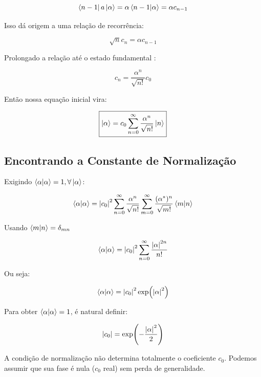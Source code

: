 \documentclass[12pt,a4paper]{report}
\begin{document}
\begin{equation*}
    \bra{n-1}a\ket{\alpha}=\alpha\braket{n-1}{\alpha}=\alpha c_{n-1}
\end{equation*}

Isso dá origem a uma relação de recorrência:

\begin{equation}
    \sqrt{n}c_n=\alpha c_{n-1}
\end{equation}

Prolongado a relação até o estado fundamental :

\begin{equation}
    c_n=\frac{\alpha^n}{\sqrt{n!}}c_0
\end{equation}

Então nossa equação inicial vira:

\begin{equation}
   \boxed{\ket{\alpha}=c_0\sum_{n=0}^{\infty}\frac{\alpha^n}{\sqrt{n!}}\ket{n}}
\end{equation}

\subsection{Encontrando a Constante de Normalização}

Exigindo $\braket{\alpha}=1, \forall\ket{\alpha}$:

\begin{equation}
    \braket{\alpha}=\abs{c_0}^2\sum_{n=0}^{\infty}\frac{\alpha^n}{\sqrt{n!}}\sum_{m=0}^{\infty}\frac{(\alpha^*)^n}{\sqrt{m!}}\braket{m}{n}
\end{equation}

Usando $\braket{m}{n}=\delta_{mn}$

\begin{equation}
    \braket{\alpha}=\abs{c_0}^2\sum_{n=0}^{\infty}\frac{\abs{\alpha}^{2n}}{n!}
\end{equation}

Ou seja:

\begin{equation}
    \braket{\alpha}=\abs{c_0}^2\exp(\abs{\alpha}^2)
\end{equation}

Para obter $\braket{\alpha}=1$, é natural definir:

\begin{equation}
    \abs{c_0}=\exp(-\frac{\abs{\alpha}^2}{2})
\end{equation}

A condição de normalização não determina totalmente o coeficiente $c_0$. Podemos assumir que sua fase é nula ($c_0$ real) sem perda de generalidade.\\
\end{document}

